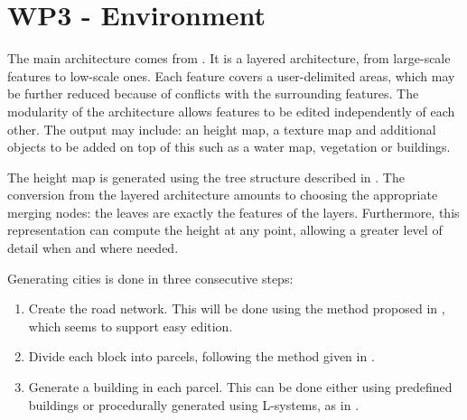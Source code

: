 \section{WP3 - Environment}

The main architecture comes from \cite{DeclarativeArchitecture}. It is a
layered architecture, from large-scale features to low-scale ones. Each feature
covers a user-delimited areas, which may be further reduced because of
conflicts with the surrounding features. The modularity of the architecture
allows features to be edited independently of each other. The output may
include: an height map, a texture map and additional objects to be added on top
of this such as a water map, vegetation or buildings.

The height map is generated using the tree structure described in
\cite{FeatureTree}. The conversion from the layered architecture amounts to
choosing the appropriate merging nodes: the leaves are exactly the features of
the layers. Furthermore, this representation can compute the height at any
point, allowing a greater level of detail when and where needed.

Generating cities is done in three consecutive steps: \begin{enumerate}
  \item Create the road network. This will be done using the method proposed in
    \cite{StreetTensors}, which seems to support easy edition.
  \item Divide each block into parcels, following the method given in
    \cite{PGParcels}.
  \item Generate a building in each parcel. This can be done either using
    predefined buildings or procedurally generated using L-systems, as in
    \cite{FLSystem}.
\end{enumerate}
